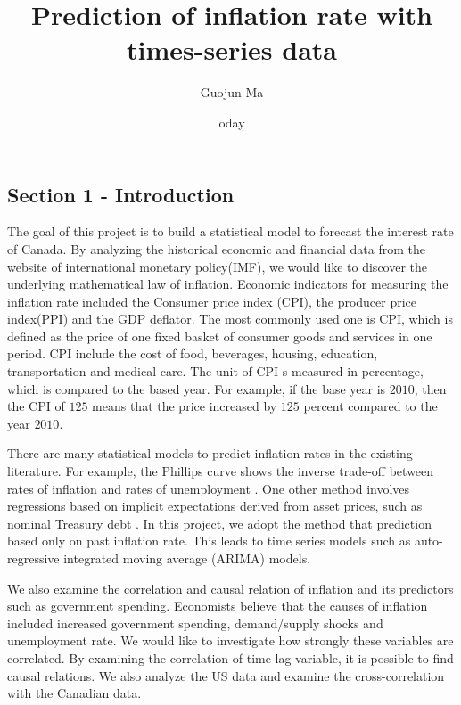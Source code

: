 \documentclass[
  12pt,
]{article}
\title{Prediction of inflation rate with times-series data}
\author{Guojun Ma}
\date{oday}
\begin{document}
\maketitle

{
\setcounter{tocdepth}{3}
\tableofcontents
}
\hypertarget{section-1---introduction}{%
\subsection{Section 1 - Introduction}\label{section-1---introduction}}

The goal of this project is to build a statistical model to forecast the
interest rate of Canada. By analyzing the historical economic and
financial data from the website of international monetary policy(IMF),
we would like to discover the underlying mathematical law of inflation.
Economic indicators for measuring the inflation rate included the
Consumer price index (CPI), the producer price index(PPI) and the GDP
deflator. The most commonly used one is CPI, which is defined as the
price of one fixed basket of consumer goods and services in one period.
CPI include the cost of food, beverages, housing, education,
transportation and medical care. The unit of CPI s measured in
percentage, which is compared to the based year. For example, if the
base year is \(2010\), then the CPI of \(125\) means that the price
increased by \(125\) percent compared to the year \(2010\).

There are many statistical models to predict inflation rates in the
existing literature. For example, the Phillips curve shows the inverse
trade-off between rates of inflation and rates of unemployment
\cite{bib1}. One other method involves regressions based on implicit
expectations derived from asset prices, such as nominal Treasury debt
\cite{bib2, bib3}. In this project, we adopt the method that prediction
based only on past inflation rate. This leads to time series models such
as auto-regressive integrated moving average (ARIMA) models.

We also examine the correlation and causal relation of inflation and its
predictors such as government spending. Economists believe that the
causes of inflation included increased government spending,
demand/supply shocks and unemployment rate. We would like to investigate
how strongly these variables are correlated. By examining the
correlation of time lag variable, it is possible to find causal
relations. We also analyze the US data and examine the cross-correlation
with the Canadian data.
\end{document}
